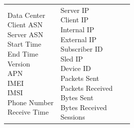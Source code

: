 \begin{description}
\begin{longtable}{p{}|p{}|p{}|p{}}
{                                                            Data Center\\
                                                            Client ASN\\
                                                            Server ASN\\
                                                            Start Time\\
                                                            End Time\\
                                                            Version\\
                                                            APN\\
                                                            IMEI\\
                                                            IMSI\\
                                                            Phone Number\\
                                                            Receive Time}
                                            &   \tabincell{l}{Server IP\\
                                                                            Client IP\\
                                                                            Internal IP\\
                                                                            External IP\\
                                                                            Subscriber ID\\
                                                                            Sled IP\\
                                                                            Device ID\\
                                                                            Packets Sent\\
                                                                            Packets Received\\
                                                                            Bytes Sent\\
                                                                            Bytes Received\\
                                                                            Sessions\\
}
\end{longtable}
\end{description}
